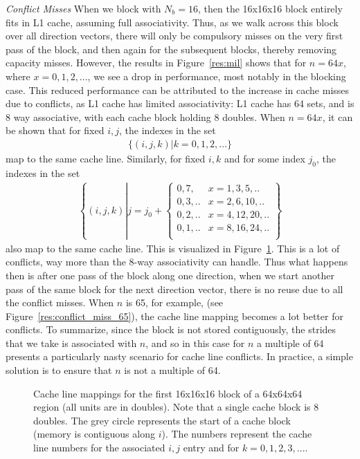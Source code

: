 \documentclass[letterpaper]{article}
\newcommand\inputpgf[2]{{
\let\pgfimageWithoutPath\pgfimage
\renewcommand{\pgfimage}[2][]{\pgfimageWithoutPath[##1]{#1/##2}}

}}
\begin{document}
\textit{Conflict Misses}
When we block with $N_b = 16$, then the 16x16x16 block entirely fits in L1 cache, assuming full associativity. Thus, as we walk across this block over all direction vectors, there will only be compulsory misses on the very first pass of the block, and then again for the subsequent blocks, thereby removing capacity misses. However, the results in Figure~\ref{res:mil} shows that for $n=64x$, where $x=0,1,2,...$, we see a drop in performance, most notably in the blocking case. This reduced performance can be attributed to the increase in cache misses due to conflicts, as L1 cache has limited associativity: L1 cache has 64 sets, and is 8 way associative, with each cache block holding 8 doubles. When $n=64x$, it can be shown that for fixed $i,j$, the indexes in the set 
\begin{align}
  \{(i,j,k) | k=0,1,2,... \}
\end{align}
map to the same cache line. Similarly, for fixed $i,k$ and for some index $j_0$, the indexes in the set
\begin{align}
  \left\{(i,j,k) \left| j = j_0 + \begin{cases}
                    0,7, & x=1,3,5,..\\
                    0,3,.. &x=2,6,10,..\\
                    0,2,.. &x=4,12,20,..\\
                    0,1,.. &x=8,16,24,..\\
                              \end{cases}
  \right. \right\}
\end{align}
also map to the same cache line. This is visualized in Figure~\ref{res:conflict_miss_64}. This is a lot of conflicts, way more than the 8-way associativity can handle. Thus what happens then is after one pass of the block along one direction, when we start another pass of the same block for the next direction vector, there is no reuse due to all the conflict misses. When $n$ is 65, for example, (see Figure~\ref{res:conflict_miss_65}), the cache line mapping becomes a lot better for conflicts. To summarize, since the block is not stored contiguously, the strides that we take is associated with $n$, and so in this case for $n$ a multiple of 64 presents a particularly nasty scenario for cache line conflicts. In practice, a simple solution is to ensure that $n$ is not a multiple of 64. 
\begin{figure}[H]
  \inputpgf{figs/conflict_miss}{mil_blocking_conflicts_64.pgf}\vspace{-1cm}
  \caption{Cache line mappings for the first 16x16x16 block of a 64x64x64 region (all units are in doubles). Note that a single cache block is 8 doubles. The grey circle represents the start of a cache block (memory is contiguous along $i$). The numbers represent the cache line numbers for the associated $i,j$ entry and for $k=0,1,2,3,...$. }
  \label{res:conflict_miss_64}
\end{figure}
\end{document}
